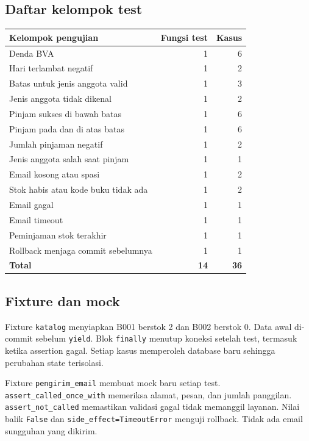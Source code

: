 \documentclass[11pt,a4paper]{article}
\begin{document}
\subsection{Daftar kelompok test}
\begin{tabularx}{\linewidth}{@{}Yrr@{}}
\toprule
{}\textbf{Kelompok pengujian} & \textbf{Fungsi test} & \textbf{Kasus}\\
\midrule
Denda BVA & 1 & 6\\
Hari terlambat negatif & 1 & 2\\
Batas untuk jenis anggota valid & 1 & 3\\
Jenis anggota tidak dikenal & 1 & 2\\
Pinjam sukses di bawah batas & 1 & 6\\
Pinjam pada dan di atas batas & 1 & 6\\
Jumlah pinjaman negatif & 1 & 2\\
Jenis anggota salah saat pinjam & 1 & 1\\
Email kosong atau spasi & 1 & 2\\
Stok habis atau kode buku tidak ada & 1 & 2\\
Email gagal & 1 & 1\\
Email timeout & 1 & 1\\
Peminjaman stok terakhir & 1 & 1\\
Rollback menjaga commit sebelumnya & 1 & 1\\
\midrule
\textbf{Total} & \textbf{14} & \textbf{36}\\
\bottomrule
\end{tabularx}

\subsection{Fixture dan mock}
Fixture \texttt{katalog} menyiapkan B001 berstok 2 dan B002 berstok 0.
Data awal di-commit sebelum \texttt{yield}. Blok \texttt{finally} menutup
koneksi setelah test, termasuk ketika assertion gagal. Setiap kasus memperoleh
database baru sehingga perubahan state terisolasi.

Fixture \texttt{pengirim\_email} membuat mock baru setiap test.
\texttt{assert\_called\_once\_with} memeriksa alamat, pesan, dan jumlah panggilan.
\texttt{assert\_not\_called} memastikan validasi gagal tidak memanggil layanan.
Nilai balik \texttt{False} dan \texttt{side\_effect=TimeoutError} menguji rollback.
Tidak ada email sungguhan yang dikirim.

\clearpage
\end{document}
